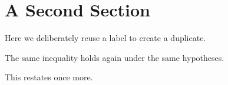 \section{A Second Section}

Here we deliberately reuse a label to create a duplicate.

\begin{theorem}
\label{thm:main}
The same inequality holds again under the same hypotheses.
\end{theorem}

This restates \cite{smith2019} once more.

